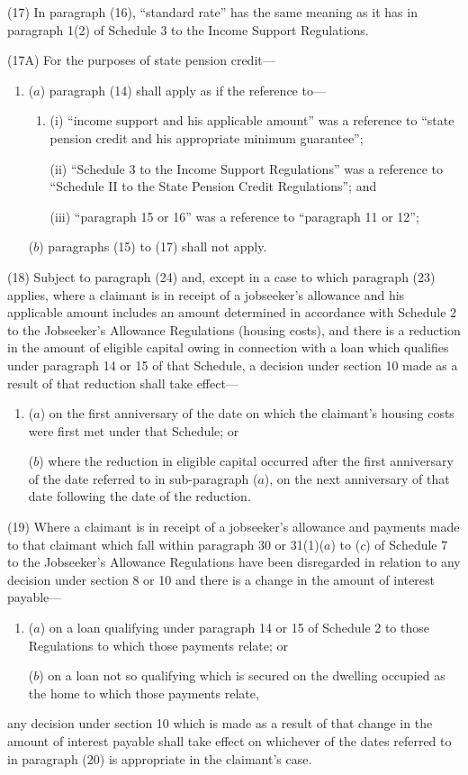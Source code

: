 \documentclass[12pt,a4paper]{article}
\begin{document}
(17) In paragraph (16), “standard rate” has the same meaning as it has in paragraph 1(2) of Schedule 3 to the Income Support Regulations.

(17A) For the purposes of state pension credit—
\begin{enumerate}\item[]
($a$) paragraph (14) shall apply as if the reference to—
\begin{enumerate}\item[]
(i) “income support and his applicable amount” was a reference to “state pension credit and his appropriate minimum guarantee”;

(ii) “Schedule 3 to the Income Support Regulations” was a reference to “Schedule II to the State Pension Credit Regulations”; and

(iii) “paragraph 15 or 16” was a reference to “paragraph 11 or 12”;
\end{enumerate}

($b$) paragraphs (15) to (17) shall not apply.
\end{enumerate}

(18) Subject to paragraph (24) and, except in a case to which paragraph (23) applies, where a claimant is in receipt of a jobseeker’s allowance and his applicable amount includes an amount determined in accordance with Schedule 2 to the Jobseeker’s Allowance Regulations (housing costs), and there is a reduction in the amount of eligible capital owing in connection with a loan which qualifies under paragraph 14 or 15 of that Schedule, a decision under section 10 made as a result of that reduction shall take effect—
\begin{enumerate}\item[]
($a$) on the first anniversary of the date on which the claimant’s housing costs were first met under that Schedule; or

($b$) where the reduction in eligible capital occurred after the first anniversary of the date referred to in sub-paragraph ($a$), on the next anniversary of that date following the date of the reduction.
\end{enumerate}

(19) Where a claimant is in receipt of a jobseeker’s allowance and payments made to that claimant which fall within paragraph 30 or 31(1)($a$) to ($c$) of Schedule 7 to the Jobseeker’s Allowance Regulations have been disregarded in relation to any decision under section 8 or 10 and there is a change in the amount of interest payable—
\begin{enumerate}\item[]
($a$) on a loan qualifying under paragraph 14 or 15 of Schedule 2 to those Regulations to which those payments relate; or

($b$) on a loan not so qualifying which is secured on the dwelling occupied as the home to which those payments relate,
\end{enumerate}
any decision under section 10 which is made as a result of that change in the amount of interest payable shall take effect on whichever of the dates referred to in paragraph (20) is appropriate in the claimant’s case.
\end{document}
